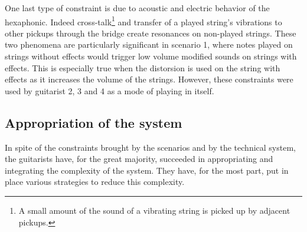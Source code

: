\documentclass{article}
\begin{document}
One last type of constraint is due to acoustic and electric behavior of the hexaphonic. Indeed cross-talk\footnote{A small amount of the sound of a vibrating string is picked up by adjacent pickups.} and transfer of a played string's vibrations to other pickups through the bridge create resonances on non-played strings. These two phenomena are particularly significant in scenario 1, where notes played on strings without effects would trigger low volume modified sounds on strings with effects. This is especially true when the distorsion is used on the string with effects as it increases the volume of the strings.
However, these constraints were used by guitarist 2, 3 and 4 as a mode of playing in itself. 




\subsection{Appropriation of the system}

In spite of the constraints brought by the scenarios and by the technical system, the guitarists have, for the great majority, succeeded in appropriating and integrating the complexity of the system. They have, for the most part, put in place various strategies to reduce this complexity.
\end{document}
